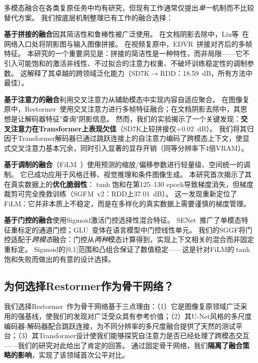 \documentclass[11pt]{ctexart}
\begin{document}
多模态融合在各类复原任务中均有研究，但现有工作通常仅提出\textit{单一}机制而不比较替代方案。
我们按底层机制整理已有工作的融合选择：

\textbf{基于拼接的融合}因其简洁性和鲁棒性被广泛使用。
在文档阴影去除中，Liu等~\cite{Liuspectral}在网络入口处将阴影图与输入图像拼接。
在视频复原中，EDVR~\cite{wang2019edvr}拼接对齐后的多帧特征。
本研究的一个重要洞见是：拼接的简洁性是一种特性，而非局限——它不引入可能饱和的激活非线性、不过拟合的注意力权重、不破坏训练稳定性的调制参数。
这解释了其卓越的跨领域泛化能力（SD7K$\rightarrow$RDD：18.59~dB，所有方法中最佳）。

\textbf{基于注意力的融合}利用交叉注意力从辅助模态中实现内容自适应聚合。
在图像复原中，Restormer~\cite{zamir2022restormer}使用交叉注意力进行多帧特征融合；在文档阴影去除中，其思想是让解码器特征"查询"阴影信息。
然而，我们的实验揭示了一个关键发现：\textbf{交叉注意力在Transformer上表现欠佳}（SD7K上较拼接仅+0.02~dB）。
我们将其归因于Transformer解码器已通过跳跃连接上的自注意力编码了跨模态上下文，使显式交叉注意力基本冗余，同时引入显著的显存开销（同等分辨率下4倍VRAM）。

\textbf{基于调制的融合}（FiLM~\cite{perez2018film}）使用预测的缩放/偏移参数进行轻量级、空间统一的调制。
它已成功应用于风格迁移、视觉推理和条件图像生成。
本研究首次揭示了其在真实数据上的\textbf{优化脆弱性}：$\tanh$饱和在第125--130 epoch导致梯度消失，但梯度裁剪可完全挽救训练（SGFM~v2：RDD上37.01~dB）。
这一发现重新定位了FiLM：它并非本质上不稳定，而是在多样化的真实数据上需要谨慎的梯度管理。

\textbf{基于门控的融合}使用Sigmoid激活门控选择性混合特征。
SENet~\cite{hu2018squeeze}推广了单模态特征重标定的通道门控；GLU~\cite{shazeer2020glu}变体在语言模型中门控线性单元。
我们的SGGF将门控适配于\textit{跨模态}融合：门控从\textit{两种}模态计算得到，实现上下文相关的混合而非固定重标定。
Sigmoid的[0,1]范围和凸组合保证了数值稳定——这是针对FiLM的$\tanh$饱和失败而做出的有意的设计选择。

\subsection{为何选择Restormer作为骨干网络？}

我们选择Restormer~\cite{zamir2022restormer}作为骨干网络基于三点理由：（1）它是图像复原领域广泛采用的强基线，使我们的发现对广泛受众具有参考价值；（2）其U-Net风格的多尺度编码器-解码器配合跳跃连接，为不同分辨率的多尺度融合提供了天然的测试平台；（3）其Transformer设计使我们能够探究自注意力是否已经处理了跨模态交互——我们的研究对此给出了肯定的回答。
通过固定骨干网络，我们\textbf{隔离了融合策略的影响}，实现了该领域首次公平对比。
\end{document}
